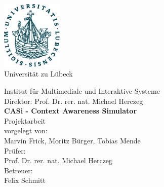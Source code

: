 \documentclass[11pt,    %
  english,ngerman,      %
  paper=a4,             %
  oneside,              %
  tablecaptionbelow,    %
  DIV=calc              %
  ]{scrbook}            %
\begin{document}
\lstset{language=Java}
\frontmatter


\thispagestyle{empty}
\vspace*{-2.2cm}
\begin{center}
  \includegraphics[width=2.9cm]{pics/uni-siegel.pdf}\\

  \vspace{.5cm}
  {
  \fontsize{16pt}{10pt}\selectfont
  Universität zu Lübeck\\
  }

  \vspace{.65cm}
  {
    \fontsize{14pt}{19pt}\selectfont
    Institut für Multimediale und Interaktive Systeme\\
    Direktor: Prof. Dr. rer. nat. Michael Herczeg\\
  }
  \vspace{2.5cm}
  {
    \fontsize{22pt}{22pt}\selectfont
    \bfseries
    CASi - Context Awareness Simulator \\}
  \vspace{1.5cm}
  {
    \fontsize{16pt}{16pt}\selectfont
    Projektarbeit\\
  }
  \vspace{1.5cm}
  {
    \fontsize{13pt}{13pt}\selectfont
    vorgelegt von:\\
    \vspace{10pt}
  Marvin Frick, Moritz Bürger, Tobias Mende\\
  }
  \vspace{2.5cm}
  {
    \fontsize{13pt}{13pt}\selectfont
    Prüfer:\\
    \vspace{10pt}
    Prof. Dr. rer. nat. Michael Herczeg\\
  }
  \vspace{1.5cm}
  {
    \fontsize{13pt}{13pt}\selectfont
    Betreuer:\\
    \vspace{10pt}
    Felix Schmitt
  }
\end{center}
\end{document}
